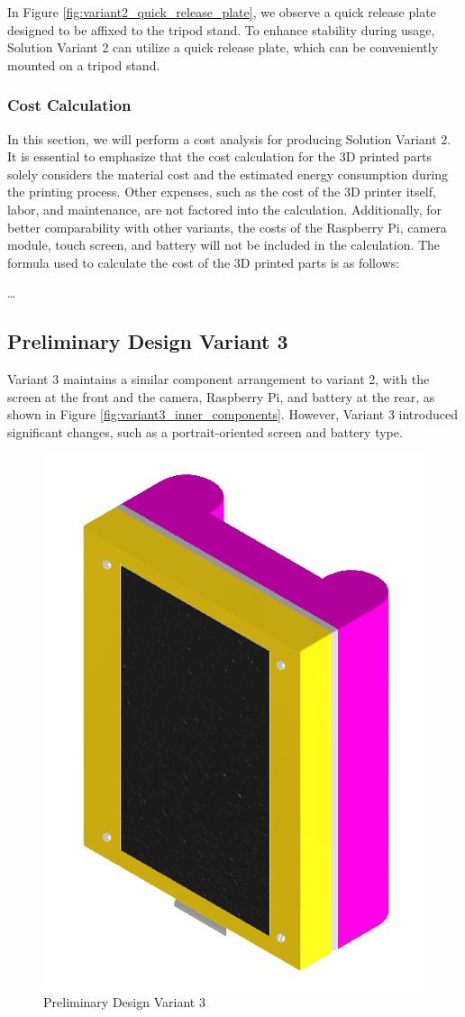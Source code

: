 In Figure \ref{fig:variant2_quick_release_plate}, we observe a quick release plate designed to be affixed to the tripod stand. To enhance stability during usage, Solution Variant 2 can utilize a quick release plate, which can be conveniently mounted on a tripod stand.

\subsubsection{Cost Calculation}
In this section, we will perform a cost analysis for producing Solution Variant 2. It is essential to emphasize that the cost calculation for the 3D printed parts solely considers the material cost and the estimated energy consumption during the printing process. Other expenses, such as the cost of the 3D printer itself, labor, and maintenance, are not factored into the calculation. Additionally, for better comparability with other variants, the costs of the Raspberry Pi, camera module, touch screen, and battery will not be included in the calculation. The formula used to calculate the cost of the 3D printed parts is as follows:

\dots


\subsection{Preliminary Design Variant 3}
\label{subsec:preliminary_design_variant_3}
Variant 3 maintains a similar component arrangement to variant 2, with the screen at the front and the camera, Raspberry Pi, and battery at the rear, as shown in Figure \ref{fig:variant3_inner_components}. However, Variant 3 introduced significant changes, such as a portrait-oriented screen and battery type.

\begin{figure}[h!]
    \centering
    \includegraphics[height=5 cm]{texs/Part1/chapter4/image/v31.png}
    \caption{Preliminary Design Variant 3}
    \label{fig:preliminary_design_variant_3}
\end{figure}

